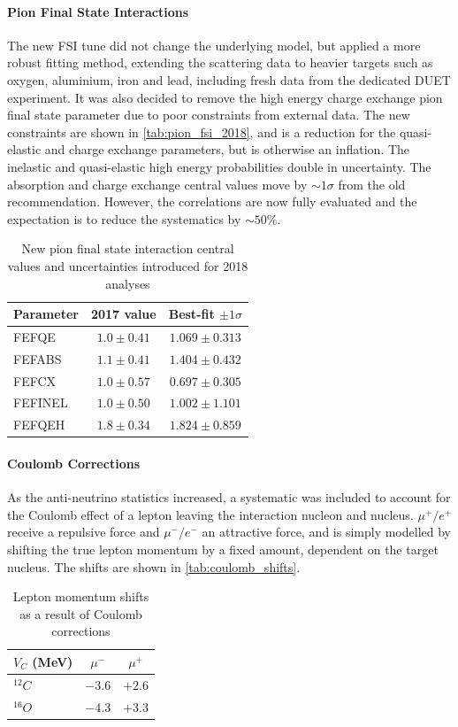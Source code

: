 \paragraph{Pion Final State Interactions}
The new FSI tune\cite{thesis_elder} did not change the underlying model, but applied a more robust fitting method, extending the scattering data to heavier targets such as oxygen, aluminium, iron and lead, including fresh data from the dedicated DUET experiment\cite{duet}. It was also decided to remove the high energy charge exchange pion final state parameter due to poor constraints from external data. The new constraints are shown in \autoref{tab:pion_fsi_2018}, and is a reduction for the quasi-elastic and charge exchange parameters, but is otherwise an inflation. The inelastic and quasi-elastic high energy probabilities double in uncertainty. The absorption and charge exchange central values move by $\sim1\sigma$ from the old recommendation. However, the correlations are now fully evaluated and the expectation is to reduce the systematics by $\sim50\%$.
\begin{table}[h]
	\begin{tabular}{l | c c}
		\hline
		\hline
		Parameter & 2017 value & Best-fit $\pm1\sigma$ \\
		\hline
		FEFQE & $1.0\pm0.41$ & $1.069\pm0.313$ \\
		FEFABS & $1.1\pm0.41$ & $1.404\pm0.432$ \\
		FEFCX & $1.0\pm0.57$ & $0.697\pm0.305$ \\
		FEFINEL & $1.0\pm0.50$ & $1.002\pm1.101$ \\
		FEFQEH & $1.8\pm0.34$ & $1.824\pm0.859$ \\
		\hline
		\hline
	\end{tabular}
\caption{New pion final state interaction central values and uncertainties introduced for 2018 analyses}
\label{tab:pion_fsi_2018}
\end{table}

\paragraph{Coulomb Corrections}
As the anti-neutrino statistics increased, a systematic was included to account for the Coulomb effect of a lepton leaving the interaction nucleon and nucleus. $\mu^+/e^+$ receive a repulsive force and $\mu^-/e^-$ an attractive force, and is simply modelled by shifting the true lepton momentum by a fixed amount, dependent on the target nucleus\cite{coulomb1, coulomb2}. The shifts are shown in \autoref{tab:coulomb_shifts}.
\begin{table}[h]
	\begin{tabular}{l | c c}
		$V_C$ (MeV) & $\mu^-$ & $\mu^+$ \\
		\hline
		$^{12}C$ & $-3.6$ & $+2.6$ \\
		$^{16}O$ & $-4.3$ & $+3.3$ \\
	\end{tabular}
		\caption{Lepton momentum shifts as a result of Coulomb corrections}
		\label{tab:coulomb_shifts}
\end{table}

